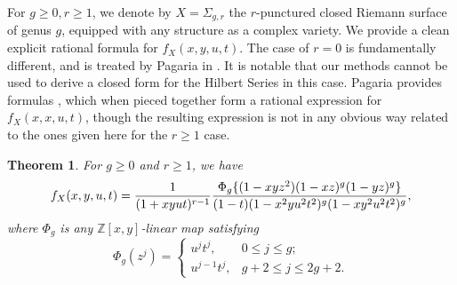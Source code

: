 \documentclass[11pt,reqno]{amsproc}
\numberwithin{equation}{section}
\newtheorem{thmab}{Theorem}
\theoremstyle{definition}
\theoremstyle{remark}
\newcommand\Z{{\mathbb Z}}
\DeclarePairedDelimiter{\set}{\{}{\}}
\begin{document}
For $g\geq0 ,r\geq 1$, we denote by $X = \Sigma_{g,r}$ the $r$-punctured closed Riemann surface of genus $g$, equipped with any structure as a complex variety. We provide a clean explicit rational formula for $f_X(x,y,u,t)$. The case of $r=0$ is fundamentally different, and is treated by Pagaria in \cite{pagaria2020cohomology}. It is notable that our methods cannot be used to derive a closed form for the Hilbert Series in this case. Pagaria provides formulas \cite[Section 3]{pagaria2020cohomology}, which when pieced together form a rational expression for $f_X(x,x,u,t)$, though the resulting expression is not in any obvious way related to the ones given here for the $r \geq 1$ case.

\begin{thmab}
For $g\geq 0$ and $r\geq 1$, we have
\begin{equation}
f_{X}(x,y,u,t)=\frac{1}{(1+xyut)^{r-1}} \frac{\Phi_g\set{(1-xyz^2)(1-xz)^g(1-yz)^g}}{(1-t)(1-x^2 yu^2t^2)^g(1-xy^2u^2t^2)^g}, \label{mainThmFormula}
\end{equation}
where $\Phi_g$ is any $\Z[x,y]$-linear map satisfying
\begin{equation}
\Phi_g(z^j)=\begin{cases}
u^j t^j,& 0\leq j\leq g;\\
u^{j-1}t^j,& g+2\leq j\leq 2g+2.
\end{cases}
\end{equation}
\label{thm:main}
\end{thmab}
\end{document}
